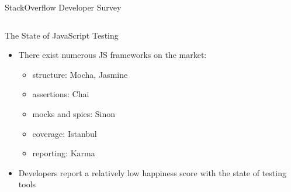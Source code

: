 \documentclass{beamer}
\begin{document}
\begin{frame}{StackOverflow Developer Survey}
\begin{columns}
  \end{columns}


\end{frame}

\begin{frame}{The State of JavaScript Testing}

  \begin{itemize}
    \item There exist numerous JS frameworks on the market:
      \begin{itemize}
        \item structure: Mocha, Jasmine
        \item assertions: Chai
        \item mocks and spies: Sinon
        \item coverage: Istanbul
        \item reporting: Karma
      \end{itemize}
   \item Developers report a relatively low happiness score with the state of testing tools
  \end{itemize}
  
\end{frame}
\end{document}
